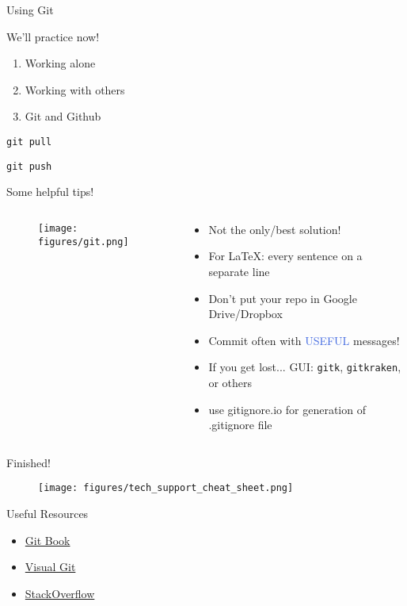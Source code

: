 \documentclass[11pt,professionalfonts]{beamer}
\def\Emph{\textcolor{RoyalBlue}}
\begin{document}
\begin{frame}{Using Git}%


We'll practice now!

\begin{enumerate}
    \item Working alone
    \item Working with others
    \item Git and Github
\end{enumerate}

\texttt{git pull}

\texttt{git push}
\end{frame}%


\begin{frame}{Some helpful tips!}%
\begin{columns}
\begin{column}{0.5\textwidth}
\begin{figure}
    \texttt{[image: figures/git.png]}
\end{figure}
\end{column}
\begin{column}{0.5\textwidth}
\begin{itemize}
    \item Not the only/best solution!
    \item For \LaTeX: every sentence on a separate line
    \item Don't put your repo in Google Drive/Dropbox
    \item Commit often with \Emph{USEFUL} messages!
    \item If you get lost... GUI: \texttt{gitk}, \texttt{gitkraken}, or others
    \item use gitignore.io for generation of .gitignore file
\end{itemize}
\end{column}
\end{columns}
\end{frame}%

\begin{frame}{Finished!}%
\begin{figure}
    \centering
    \texttt{[image: figures/tech\_support\_cheat\_sheet.png]}
\end{figure}
\end{frame}

\begin{frame}{Useful Resources}
\begin{itemize}
    \item \href{https://git-scm.com/}{Git Book}
    \item \href{http://marklodato.github.io/visual-git-guide/index-en.html}{Visual Git}
    \item \href{http://stackoverflow.com/questions/315911/git-for-beginners-the-definitive-practical-guide}{StackOverflow}
\end{itemize}
\end{frame}%
\end{document}
